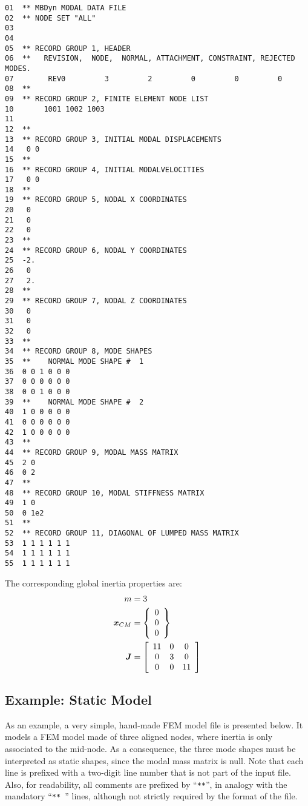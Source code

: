 {\small
\begin{verbatim}
01  ** MBDyn MODAL DATA FILE
02  ** NODE SET "ALL" 
03    
04    
05  ** RECORD GROUP 1, HEADER
06  **   REVISION,  NODE,  NORMAL, ATTACHMENT, CONSTRAINT, REJECTED MODES.
07        REV0         3         2         0         0         0
08  **
09  ** RECORD GROUP 2, FINITE ELEMENT NODE LIST
10       1001 1002 1003
11  
12  **
13  ** RECORD GROUP 3, INITIAL MODAL DISPLACEMENTS
14   0 0
15  **
16  ** RECORD GROUP 4, INITIAL MODALVELOCITIES
17   0 0
18  **
19  ** RECORD GROUP 5, NODAL X COORDINATES
20   0
21   0
22   0
23  **
24  ** RECORD GROUP 6, NODAL Y COORDINATES
25  -2.
26   0
27   2.
28  **
29  ** RECORD GROUP 7, NODAL Z COORDINATES
30   0
31   0
32   0
33  **
34  ** RECORD GROUP 8, MODE SHAPES
35  **    NORMAL MODE SHAPE #  1
36  0 0 1 0 0 0
37  0 0 0 0 0 0
38  0 0 1 0 0 0
39  **    NORMAL MODE SHAPE #  2
40  1 0 0 0 0 0
41  0 0 0 0 0 0
42  1 0 0 0 0 0
43  **
44  ** RECORD GROUP 9, MODAL MASS MATRIX
45  2 0
46  0 2
47  **
48  ** RECORD GROUP 10, MODAL STIFFNESS MATRIX
49  1 0
50  0 1e2
51  **
52  ** RECORD GROUP 11, DIAGONAL OF LUMPED MASS MATRIX
53  1 1 1 1 1 1
54  1 1 1 1 1 1
55  1 1 1 1 1 1
\end{verbatim}
}

The corresponding global inertia properties are:
\begin{align}
	m		&= 3 \\
	\T{x}_{CM}	&= \cubr{\cvvect{
		0 \\
		0 \\
		0
	}} \\
	\T{J}		&= \sqbr{\matr{ccc}{
		11 &  0 &  0 \\
		 0 &  3 &  0 \\
		 0 &  0 & 11
	}}
\end{align}


\subsection{Example: Static Model}
As an example, a very simple, hand-made FEM model file is presented below.
It models a FEM model made of three aligned nodes, where inertia 
is only associated to the mid-node.
As a consequence, the three mode shapes must be interpreted as static
shapes, since the modal mass matrix is null.
Note that each line is prefixed with a two-digit line number 
that is not part of the input file.
Also, for readability, all comments are prefixed by ``\texttt{**}'', in analogy
with the mandatory ``\texttt{** }'' lines, although not strictly 
required by the format of the file.

